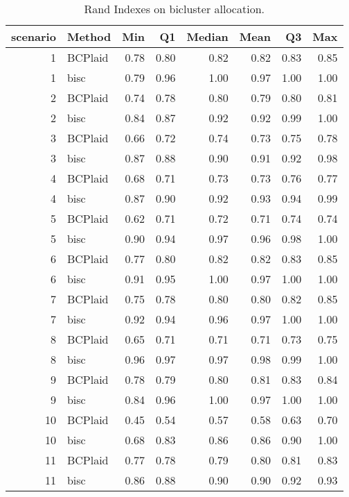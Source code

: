 \begin{table}[ht]
\caption{Rand Indexes on bicluster allocation.}
\vspace{1.5cm}
\centering
\begin{tabular}{rlrrrrrr}
  \toprule
scenario & Method & Min & Q1 & Median & Mean & Q3 & Max \\ 
  \midrule
  1 & BCPlaid & 0.78 & 0.80 & 0.82 & 0.82 & 0.83 & 0.85 \\ 
    1 & bisc & 0.79 & 0.96 & 1.00 & 0.97 & 1.00 & 1.00 \\ 
    2 & BCPlaid & 0.74 & 0.78 & 0.80 & 0.79 & 0.80 & 0.81 \\ 
    2 & bisc & 0.84 & 0.87 & 0.92 & 0.92 & 0.99 & 1.00 \\ 
    3 & BCPlaid & 0.66 & 0.72 & 0.74 & 0.73 & 0.75 & 0.78 \\ 
    3 & bisc & 0.87 & 0.88 & 0.90 & 0.91 & 0.92 & 0.98 \\ 
    4 & BCPlaid & 0.68 & 0.71 & 0.73 & 0.73 & 0.76 & 0.77 \\ 
    4 & bisc & 0.87 & 0.90 & 0.92 & 0.93 & 0.94 & 0.99 \\ 
    5 & BCPlaid & 0.62 & 0.71 & 0.72 & 0.71 & 0.74 & 0.74 \\ 
    5 & bisc & 0.90 & 0.94 & 0.97 & 0.96 & 0.98 & 1.00 \\ 
    6 & BCPlaid & 0.77 & 0.80 & 0.82 & 0.82 & 0.83 & 0.85 \\ 
    6 & bisc & 0.91 & 0.95 & 1.00 & 0.97 & 1.00 & 1.00 \\ 
    7 & BCPlaid & 0.75 & 0.78 & 0.80 & 0.80 & 0.82 & 0.85 \\ 
    7 & bisc & 0.92 & 0.94 & 0.96 & 0.97 & 1.00 & 1.00 \\ 
    8 & BCPlaid & 0.65 & 0.71 & 0.71 & 0.71 & 0.73 & 0.75 \\ 
    8 & bisc & 0.96 & 0.97 & 0.97 & 0.98 & 0.99 & 1.00 \\ 
    9 & BCPlaid & 0.78 & 0.79 & 0.80 & 0.81 & 0.83 & 0.84 \\ 
    9 & bisc & 0.84 & 0.96 & 1.00 & 0.97 & 1.00 & 1.00 \\ 
   10 & BCPlaid & 0.45 & 0.54 & 0.57 & 0.58 & 0.63 & 0.70 \\ 
   10 & bisc & 0.68 & 0.83 & 0.86 & 0.86 & 0.90 & 1.00 \\ 
   11 & BCPlaid & 0.77 & 0.78 & 0.79 & 0.80 & 0.81 & 0.83 \\ 
   11 & bisc & 0.86 & 0.88 & 0.90 & 0.90 & 0.92 & 0.93 \\ 

\end{tabular}
\end{table}
